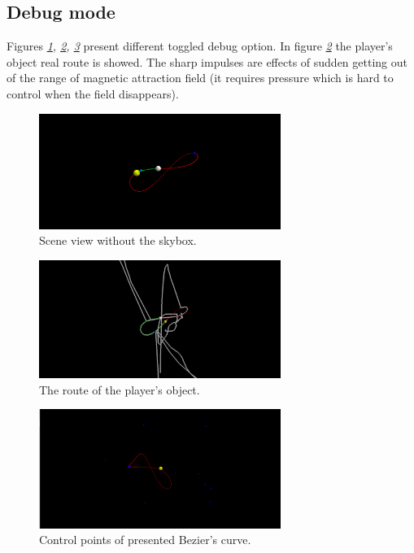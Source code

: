 \subsection{Debug mode}
Figures \emph{\ref{fig:no_skybox}, \ref{fig:route}, \ref{fig:points}} present different toggled debug option. In figure \emph{\ref{fig:route}} the player's object real route is showed. The sharp impulses are effects of sudden getting out of the range of magnetic attraction field (it requires pressure which is hard to control when the field disappears).
\begin{figure}
\begin{center}
\includegraphics[width=0.7\textwidth]{Images/noskybox}%
\end{center}
\caption{Scene view without the skybox.}
\label{fig:no_skybox}
\end{figure}

\begin{figure}
\begin{center}
\includegraphics[width=0.7\textwidth]{Images/route}%
\end{center}
\caption{The route of the player's object.}
\label{fig:route}
\end{figure}

\begin{figure}
\begin{center}
\includegraphics[width=0.7\textwidth]{Images/points}%
\end{center}
\caption{Control points of presented Bezier's curve.}
\label{fig:points}
\end{figure}

